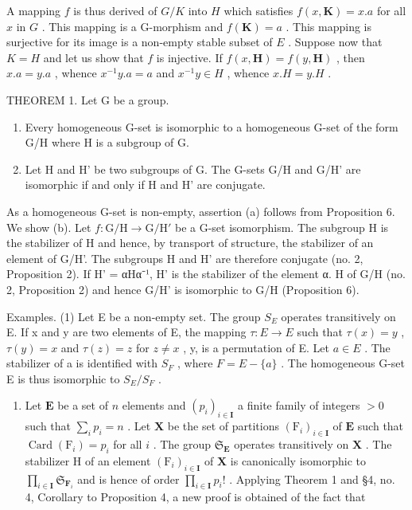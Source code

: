 A mapping \(f\) is thus derived of \(G / K\) into \(H\) which satisfies \(f(x, \mathbf{K}) = x.a\) for all \(x\) in \(G\) . This mapping is a G-morphism and \(f(\mathbf{K}) = a\) . This mapping is surjective for its image is a non-empty stable subset of \(E\) . Suppose now that \(K = H\) and let us show that \(f\) is injective. If \(f(x, \mathbf{H}) = f(y, \mathbf{H})\) , then \(x.a = y.a\) , whence \(x^{-1}y.a = a\) and \(x^{-1}y \in H\) , whence \(x.H = y.H\) .

THEOREM 1. Let G be a group.

\begin{enumerate}
\def\labelenumi{(\alph{enumi})}
\item
  Every homogeneous G-set is isomorphic to a homogeneous G-set of the form G/H where H is a subgroup of G.
\item
  Let H and H' be two subgroups of G. The G-sets G/H and G/H' are isomorphic if and only if H and H' are conjugate.
\end{enumerate}

As a homogeneous G-set is non-empty, assertion (a) follows from Proposition 6. We show (b). Let \(f: \mathrm{G} / \mathrm{H} \to \mathrm{G} / \mathrm{H}'\) be a G-set isomorphism. The subgroup H is the stabilizer of H and hence, by transport of structure, the stabilizer of an element of G/H'. The subgroups H and H' are therefore conjugate (no. 2, Proposition 2). If H' = αHα⁻¹, H' is the stabilizer of the element α. H of G/H (no. 2, Proposition 2) and hence G/H' is isomorphic to G/H (Proposition 6).

Examples. (1) Let E be a non-empty set. The group \(S_{E}\) operates transitively on E. If x and y are two elements of E, the mapping \(\tau: E \to E\) such that \(\tau(x) = y\) , \(\tau(y) = x\) and \(\tau(z) = z\) for \(z \neq x\) , y, is a permutation of E. Let \(a \in E\) . The stabilizer of a is identified with \(S_{F}\) , where \(F = E - \{a\}\) . The homogeneous G-set E is thus isomorphic to \(S_{E}/S_{F}\) .

\begin{enumerate}
\def\labelenumi{(\arabic{enumi})}
\setcounter{enumi}{1}
\tightlist
\item
  Let \(\mathbf{E}\) be a set of \(n\) elements and \((p_i)_{i\in \mathbf{I}}\) a finite family of integers \(>0\) such that \(\sum_{i}p_{i} = n\) . Let \(\mathbf{X}\) be the set of partitions \((\mathrm{F}_i)_{i\in \mathbf{I}}\) of \(\mathbf{E}\) such that \(\operatorname {Card}(\mathrm{F}_i) = p_i\) for all \(i\) . The group \(\mathfrak{S}_{\mathbf{E}}\) operates transitively on \(\mathbf{X}\) . The stabilizer H of an element \((\mathrm{F}_i)_{i\in \mathbf{I}}\) of \(\mathbf{X}\) is canonically isomorphic to \(\prod_{i\in \mathbf{I}}\mathfrak{S}_{\mathbf{F}_i}\) and is hence of order \(\prod_{i\in \mathbf{I}}p_i!\) . Applying Theorem 1 and §4, no. 4, Corollary to Proposition 4, a new proof is obtained of the fact that
\end{enumerate}

